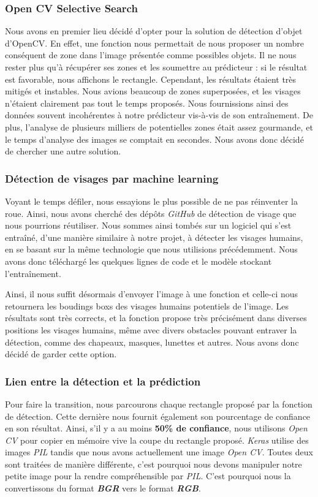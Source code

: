 \documentclass{rapport}
\begin{document}
            \subsubsection{Open CV Selective Search}
            Nous avons en premier lieu décidé d'opter pour la solution de détection d'objet d'OpenCV. En effet, une fonction nous permettait de nous proposer un nombre conséquent de zone dans l'image présentée comme possibles objets. Il ne nous rester plus qu'à récupérer ses zones et les soumettre au prédicteur : si le résultat est favorable, nous affichons le rectangle. Cependant, les résultats étaient très mitigés et instables. Nous avions beaucoup de zones superposées, et les visages n'étaient clairement pas tout le temps proposés. Nous fournissions ainsi des données souvent incohérentes à notre prédicteur vis-à-vis de son entraînement. De plus, l'analyse de plusieurs milliers de potentielles zones était assez gourmande, et le temps d'analyse des images se comptait en secondes. Nous avons donc décidé de chercher une autre solution.
            
            \subsubsection{Détection de visages par machine learning}
            Voyant le temps défiler, nous essayions le plus possible de ne pas réinventer la roue. Ainsi, nous avons cherché des dépôts \textit{GitHub} de détection de visage que nous pourrions réutiliser. Nous sommes ainsi tombés sur un logiciel\cite{gitFace} qui s'est entraîné, d'une manière similaire à notre projet, à détecter les visages humains, en se basant sur la même technologie que nous utilisions précédemment. Nous avons donc téléchargé les quelques lignes de code et le modèle stockant l'entraînement.

            Ainsi, il nous suffit désormais d'envoyer l'image à une fonction et celle-ci nous retournera les boudings boxs des visages humains potentiels de l'image. Les résultats sont très corrects, et la fonction propose très précisément dans diverses positions les visages humains, même avec divers obstacles pouvant entraver la détection, comme des chapeaux, masques, lunettes et autres. Nous avons donc décidé de garder cette option.
            
            \subsubsection{Lien entre la détection et la prédiction}
            Pour faire la transition, nous parcourons chaque rectangle proposé par la fonction de détection. Cette dernière nous fournit également son pourcentage de confiance en son résultat. Ainsi, s'il y a au moins \textbf{50\% de confiance}, nous utilisons \textit{Open CV} pour copier en mémoire vive la coupe du rectangle proposé. \textit{Keras} utilise des images \textit{PIL} tandis que nous avons actuellement une image \textit{Open CV}. Toutes deux sont traitées de manière différente, c'est pourquoi nous devons manipuler notre petite image pour la rendre compréhensible par \textit{PIL}. C'est pourquoi nous la convertissons du format \textit{\textbf{BGR}} vers le format \textit{\textbf{RGB}}.
\end{document}
